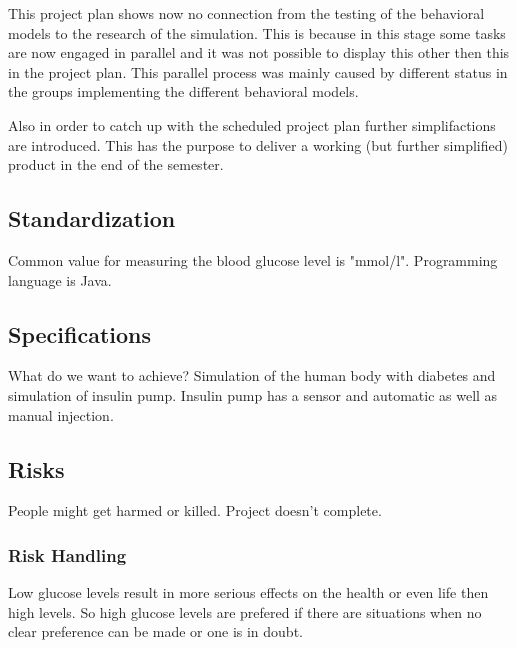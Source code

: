 This project plan shows now no connection from the testing of the behavioral
models to the research of the simulation.
This is because in this stage some tasks are now engaged in parallel and it was
not possible to display this other then this in the project plan.
This parallel process was mainly caused by different status in the groups
implementing the different behavioral models.

Also in order to catch up with the scheduled project plan further
simplifactions are introduced.
This has the purpose to deliver a working (but further simplified) product in
the end of the semester.

\subsection{Standardization}
Common value for measuring the blood glucose level is "mmol/l".
Programming language is Java.

\subsection{Specifications}
What do we want to achieve?
Simulation of the human body with diabetes and simulation of insulin pump.
Insulin pump has a sensor and automatic as well as manual injection.

\subsection{Risks}
People might get harmed or killed.
Project doesn't complete.

\subsubsection{Risk Handling}
Low glucose levels result in more serious effects on the health or even life then high levels.
So high glucose levels are prefered if there are situations when no clear preference can be made or one is in doubt.